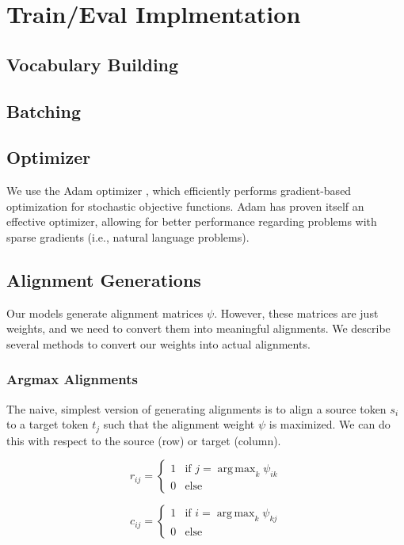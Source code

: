 \documentclass[twoside,twocolumn]{article}
\DeclareMathOperator*{\argmax}{arg\,max}
\begin{document}
\section{Train/Eval Implmentation}

\subsection{Vocabulary Building}

\subsection{Batching}

\subsection{Optimizer}
We use the Adam optimizer \cite{kingma2014adam}, which efficiently performs
gradient-based optimization for stochastic objective functions. Adam has proven
itself an effective optimizer, allowing for better performance regarding
problems with sparse gradients (i.e., natural language problems).

\subsection{Alignment Generations}
Our models generate alignment matrices $\psi$. However, these matrices are just
weights, and we need to convert them into meaningful alignments. We describe
several methods to convert our weights into actual alignments.

\subsubsection{Argmax Alignments}
The naive, simplest version of generating alignments is to align a source token
$s_i$ to a target token $t_j$ such that the alignment weight $\psi$ is
maximized. We can do this with respect to the source (row) or target (column).

\begin{equation}
  r_{ij} = \begin{cases}
    1 & \text{if } j=\argmax_k \psi_{ik} \\
    0 & \text{else}
  \end{cases}
\end{equation}

\begin{equation}
  c_{ij} = \begin{cases}
    1 & \text{if } i=\argmax_k \psi_{kj} \\
    0 & \text{else}
  \end{cases}
\end{equation}
\end{document}
